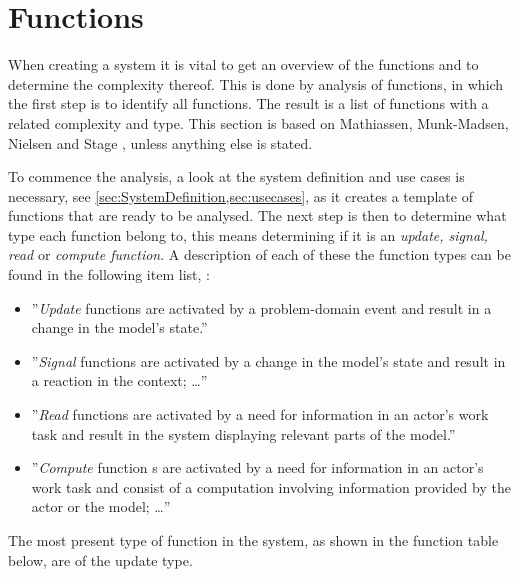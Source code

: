 \section{Functions} \label{sec:functions}
When creating a system it is vital to get an overview of the functions and to determine the complexity thereof.
This is done by analysis of functions, in which the first step is to identify all functions.
The result is a list of functions with a related complexity and type.
This section is based on Mathiassen, Munk-Madsen, Nielsen and Stage \citep[ch.~7]{Rod-Aalborg}, unless anything else is stated.

To commence the analysis, a look at the system definition and use cases is necessary, see \cref{sec:SystemDefinition,sec:usecases}, as it creates a template of functions that are ready to be analysed.
The next step is then to determine what type each function belong to, this means determining if it is an \textit{update, signal, read} or \textit{compute function}.
A description of each of these the function types can be found in the following item list, \citep[p.~140]{Rod-Aalborg}:
\begin{itemize}
	\item 
	''\textit{Update} functions are  activated by a problem-domain event and result in a change in the model's state.''
	\item 
	''\textit{Signal} functions are activated by a change in the model's state and result in a reaction in the context; \ldots''
	\item
	''\textit{Read} functions are activated by a need for information in an actor's work task and result in the system displaying relevant parts of the model.''
	\item
	''\textit{Compute} function s are activated by a need for information in an actor's work task and consist of a computation involving information provided by the actor or the model; \ldots''
\end{itemize}

The most present type of function in the system, as shown in the function table below, are of the update type.


